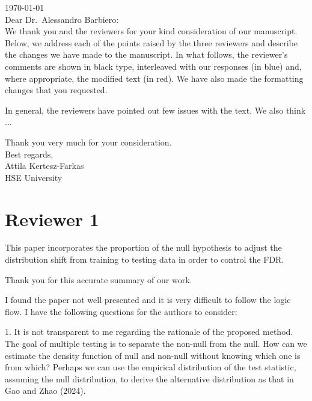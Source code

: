 \documentclass{article}
\newcommand{\response}[1]{\vspace*{1ex} \color{blue} \noindent #1 \color{black}
\vspace*{2ex}}
\begin{document}
	
\noindent
\today\\[2ex]

\noindent
Dear Dr.\ Alessandro Barbiero:\\[2ex]

We thank you and the reviewers for your kind consideration of our manuscript.
Below, we address each of the points raised by the three reviewers and describe the changes we have made to the manuscript.
In what follows, the reviewer's comments are shown in black type, interleaved with our responses (in blue) and, where appropriate, the modified text (in red).
We have also made the formatting changes that you requested.

In general, the reviewers have pointed out few issues with the text. We also think ...

Thank you very much for your consideration.\\[2ex]

\noindent
Best regards,\\[2ex]

\noindent
Attila Kertesz-Farkas\\
HSE University

\clearpage
\section*{Reviewer 1}

This paper incorporates the proportion of the null hypothesis to adjust the distribution shift from training to testing data in order to control the FDR. 

\response{Thank you for this accurate summary of our work.}

I found the paper not well presented and it is very difficult to follow the logic flow. I have the following questions for the authors to consider:

1. It is not transparent to me regarding the rationale of the proposed method. The goal of multiple testing is to separate the non-null from the null. How can we estimate the density function of null and non-null without knowing which one is from which? Perhaps we can use the empirical distribution of the test statistic, assuming the null distribution, to derive the alternative distribution as that in Gao and Zhao (2024).
\end{document}
